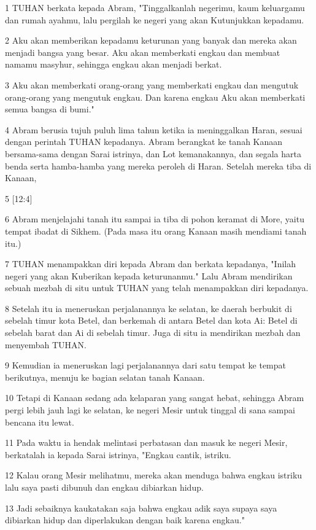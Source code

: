 \par 1 TUHAN berkata kepada Abram, "Tinggalkanlah negerimu, kaum keluargamu dan rumah ayahmu, lalu pergilah ke negeri yang akan Kutunjukkan kepadamu.
\par 2 Aku akan memberikan kepadamu keturunan yang banyak dan mereka akan menjadi bangsa yang besar. Aku akan memberkati engkau dan membuat namamu masyhur, sehingga engkau akan menjadi berkat.
\par 3 Aku akan memberkati orang-orang yang memberkati engkau dan mengutuk orang-orang yang mengutuk engkau. Dan karena engkau Aku akan memberkati semua bangsa di bumi."
\par 4 Abram berusia tujuh puluh lima tahun ketika ia meninggalkan Haran, sesuai dengan perintah TUHAN kepadanya. Abram berangkat ke tanah Kanaan bersama-sama dengan Sarai istrinya, dan Lot kemanakannya, dan segala harta benda serta hamba-hamba yang mereka peroleh di Haran. Setelah mereka tiba di Kanaan,
\par 5 [12:4]
\par 6 Abram menjelajahi tanah itu sampai ia tiba di pohon keramat di More, yaitu tempat ibadat di Sikhem. (Pada masa itu orang Kanaan masih mendiami tanah itu.)
\par 7 TUHAN menampakkan diri kepada Abram dan berkata kepadanya, "Inilah negeri yang akan Kuberikan kepada keturunanmu." Lalu Abram mendirikan sebuah mezbah di situ untuk TUHAN yang telah menampakkan diri kepadanya.
\par 8 Setelah itu ia meneruskan perjalanannya ke selatan, ke daerah berbukit di sebelah timur kota Betel, dan berkemah di antara Betel dan kota Ai: Betel di sebelah barat dan Ai di sebelah timur. Juga di situ ia mendirikan mezbah dan menyembah TUHAN.
\par 9 Kemudian ia meneruskan lagi perjalanannya dari satu tempat ke tempat berikutnya, menuju ke bagian selatan tanah Kanaan.
\par 10 Tetapi di Kanaan sedang ada kelaparan yang sangat hebat, sehingga Abram pergi lebih jauh lagi ke selatan, ke negeri Mesir untuk tinggal di sana sampai bencana itu lewat.
\par 11 Pada waktu ia hendak melintasi perbatasan dan masuk ke negeri Mesir, berkatalah ia kepada Sarai istrinya, "Engkau cantik, istriku.
\par 12 Kalau orang Mesir melihatmu, mereka akan menduga bahwa engkau istriku lalu saya pasti dibunuh dan engkau dibiarkan hidup.
\par 13 Jadi sebaiknya kaukatakan saja bahwa engkau adik saya supaya saya dibiarkan hidup dan diperlakukan dengan baik karena engkau."
